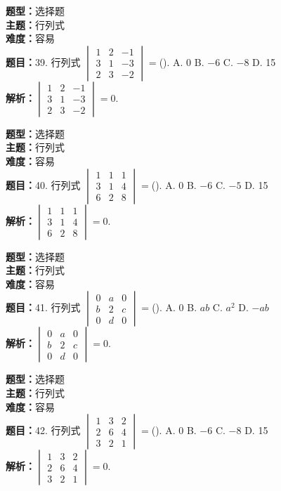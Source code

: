 \documentclass{ctexart}
\newenvironment{question}[5]{%
	\noindent\textbf{题型：}#1\\
	\textbf{主题：}#2\\
	\textbf{难度：}#3\\
	\textbf{题目：}#4\\
	\textbf{解析：}#5\\
	\vspace{1em}
}{}
\begin{document}
	\begin{question}
		{选择题}
		{行列式}
		{容易}
		{39. 行列式 \(\begin{vmatrix} 1 & 2 & -1 \\ 3 & 1 & -3 \\ 2 & 3 & -2\end{vmatrix}=\)(\qquad). 
			A. 0 \quad B. \(-6\) \quad C. \(-8\) \quad D. 15}
		{\(\begin{vmatrix} 1 & 2 & -1 \\ 3 & 1 & -3 \\ 2 & 3 & -2\end{vmatrix}=0\). }
	\end{question}
	
	\begin{question}
		{选择题}
		{行列式}
		{容易}
		{40. 行列式 \(\begin{vmatrix} 1 & 1 & 1 \\ 3 & 1 & 4 \\ 6 & 2 & 8\end{vmatrix}=\)(\qquad). 
			A. 0 \quad B. \(-6\) \quad C. \(-5\) \quad D. 15}
		{\(\begin{vmatrix} 1 & 1 & 1 \\ 3 & 1 & 4 \\ 6 & 2 & 8\end{vmatrix}=0\). }
	\end{question}
	
	\begin{question}
		{选择题}
		{行列式}
		{容易}
		{41. 行列式 \(\begin{vmatrix} 0 & a & 0 \\ b & 2 & c \\ 0 & d & 0\end{vmatrix}=\)(\qquad). 
			A. 0 \quad B. \(ab\) \quad C. \(a^2\) \quad D. \(-ab\)}
		{\(\begin{vmatrix} 0 & a & 0 \\ b & 2 & c \\ 0 & d & 0\end{vmatrix}=0\). }
	\end{question}
	
	\begin{question}
		{选择题}
		{行列式}
		{容易}
		{42. 行列式 \(\begin{vmatrix} 1 & 3 & 2 \\ 2 & 6 & 4 \\ 3 & 2 & 1\end{vmatrix}=\)(\qquad). 
			A. 0 \quad B. \(-6\) \quad C. \(-8\) \quad D. 15}
		{\(\begin{vmatrix} 1 & 3 & 2 \\ 2 & 6 & 4 \\ 3 & 2 & 1\end{vmatrix}=0\). }
	\end{question}
	
\end{document}

